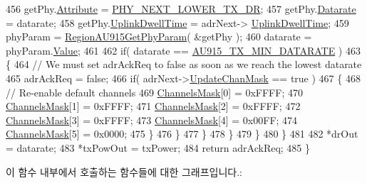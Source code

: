 \begin{DoxyCode}
456                     getPhy.\mbox{\hyperlink{structs_get_phy_params_abdcb168ffd6913b85e2f635d7a475f2d}{Attribute}} = \mbox{\hyperlink{group___r_e_g_i_o_n_gga51cbe8f5433d914fe9cf81b451de2c2dac002e7e492cf30dbf9c544b062f5cc8a}{PHY\_NEXT\_LOWER\_TX\_DR}};
457                     getPhy.\mbox{\hyperlink{structs_get_phy_params_ae2f6080f3aa0e9485c55513ca56bb24d}{Datarate}} = datarate;
458                     getPhy.\mbox{\hyperlink{structs_get_phy_params_a0e6663762d6f9173bc8d8cb018f8f17a}{UplinkDwellTime}} = adrNext->
      \mbox{\hyperlink{structs_adr_next_params_a0e6663762d6f9173bc8d8cb018f8f17a}{UplinkDwellTime}};
459                     phyParam = \mbox{\hyperlink{group___r_e_g_i_o_n_a_u915_ga91322f6f4dc9d6155316edd4dc198830}{RegionAU915GetPhyParam}}( &getPhy );
460                     datarate = phyParam.\mbox{\hyperlink{unionu_phy_param_a8e0dcce3428a8051614e852b8836d0d1}{Value}};
461 
462                     \textcolor{keywordflow}{if}( datarate == \mbox{\hyperlink{group___r_e_g_i_o_n_a_u915_ga3a7bb744191d2b9daaf6637d36d78422}{AU915\_TX\_MIN\_DATARATE}} )
463                     \{
464                         \textcolor{comment}{// We must set adrAckReq to false as soon as we reach the lowest datarate}
465                         adrAckReq = \textcolor{keyword}{false};
466                         \textcolor{keywordflow}{if}( adrNext->\mbox{\hyperlink{structs_adr_next_params_a708080da9c63d868556b2c48cb53003b}{UpdateChanMask}} == \textcolor{keyword}{true} )
467                         \{
468                             \textcolor{comment}{// Re-enable default channels}
469                             \mbox{\hyperlink{_region_a_u915_8c_a2188957b5ca6af8092154d7ccbfa5757}{ChannelsMask}}[0] = 0xFFFF;
470                             \mbox{\hyperlink{_region_a_u915_8c_a2188957b5ca6af8092154d7ccbfa5757}{ChannelsMask}}[1] = 0xFFFF;
471                             \mbox{\hyperlink{_region_a_u915_8c_a2188957b5ca6af8092154d7ccbfa5757}{ChannelsMask}}[2] = 0xFFFF;
472                             \mbox{\hyperlink{_region_a_u915_8c_a2188957b5ca6af8092154d7ccbfa5757}{ChannelsMask}}[3] = 0xFFFF;
473                             \mbox{\hyperlink{_region_a_u915_8c_a2188957b5ca6af8092154d7ccbfa5757}{ChannelsMask}}[4] = 0x00FF;
474                             \mbox{\hyperlink{_region_a_u915_8c_a2188957b5ca6af8092154d7ccbfa5757}{ChannelsMask}}[5] = 0x0000;
475                         \}
476                     \}
477                 \}
478             \}
479         \}
480     \}
481 
482     *drOut = datarate;
483     *txPowOut = txPower;
484     \textcolor{keywordflow}{return} adrAckReq;
485 \}
\end{DoxyCode}
이 함수 내부에서 호출하는 함수들에 대한 그래프입니다.\+:
\mbox{\label{group___r_e_g_i_o_n_a_u915_gacbffbc0a51e677e74827e5965a3798a5}} 
